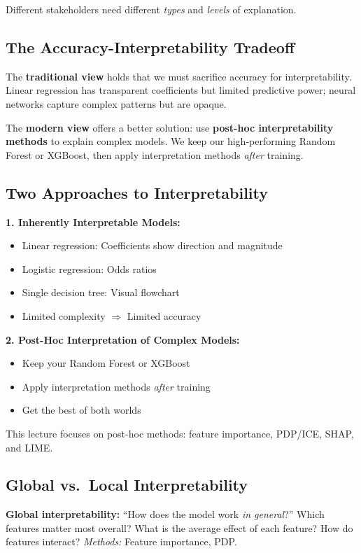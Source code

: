 \documentclass[11pt,a4paper]{article}
\newcommand{\keyword}[1]{\textbf{\textcolor{AccentOrange}{#1}}}
\begin{document}
Different stakeholders need different \emph{types} and \emph{levels} of explanation.

\subsection{The Accuracy-Interpretability Tradeoff}

The \textbf{traditional view} holds that we must sacrifice accuracy for interpretability. Linear regression has transparent coefficients but limited predictive power; neural networks capture complex patterns but are opaque.

The \textbf{modern view} offers a better solution: use \keyword{post-hoc interpretability methods} to explain complex models. We keep our high-performing Random Forest or XGBoost, then apply interpretation methods \emph{after} training.

\subsection{Two Approaches to Interpretability}

\textbf{1. Inherently Interpretable Models:}
\begin{itemize}
    \item Linear regression: Coefficients show direction and magnitude
    \item Logistic regression: Odds ratios
    \item Single decision tree: Visual flowchart
    \item Limited complexity $\Rightarrow$ Limited accuracy
\end{itemize}

\textbf{2. Post-Hoc Interpretation of Complex Models:}
\begin{itemize}
    \item Keep your Random Forest or XGBoost
    \item Apply interpretation methods \emph{after} training
    \item Get the best of both worlds
\end{itemize}

This lecture focuses on post-hoc methods: feature importance, PDP/ICE, SHAP, and LIME.

\subsection{Global vs.\ Local Interpretability}

\textbf{Global interpretability:} ``How does the model work \emph{in general}?'' Which features matter most overall? What is the average effect of each feature? How do features interact? \emph{Methods:} Feature importance, PDP.
\end{document}
